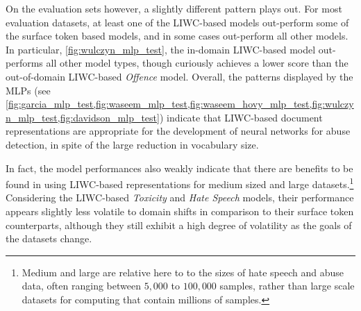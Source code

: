 On the evaluation sets however, a slightly different pattern plays out. For most evaluation datasets, at least one of the LIWC-based models out-perform some of the surface token based models, and in some cases out-perform all other models. 
In particular, \cref{fig:wulczyn_mlp_test}, the in-domain LIWC-based model out-performs all other model types, though curiously achieves a lower score than the out-of-domain LIWC-based \textit{Offence} model.
Overall, the patterns displayed by the MLPs (see \cref{fig:garcia_mlp_test,fig:waseem_mlp_test,fig:waseem_hovy_mlp_test,fig:wulczyn_mlp_test,fig:davidson_mlp_test}) indicate that LIWC-based document representations are appropriate for the development of neural networks for abuse detection, in spite of the large reduction in vocabulary size.

In fact, the model performances also weakly indicate that there are benefits to be found in using LIWC-based representations for medium sized and large datasets.\footnote{Medium and large are relative here to to the sizes of hate speech and abuse data, often ranging between $5,000$ to $100,000$ samples, rather than large scale datasets for computing that contain millions of samples.} 
Considering the LIWC-based \textit{Toxicity} and \textit{Hate Speech} models, their performance appears slightly less volatile to domain shifts in comparison to their surface token counterparts, although they still exhibit a high degree of volatility as the goals of the datasets change.

